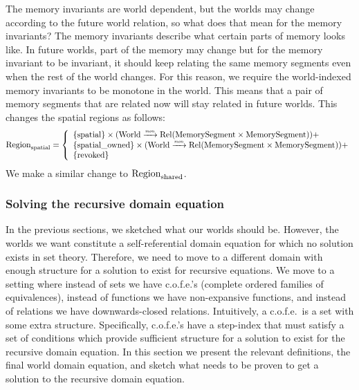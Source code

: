 \begin{jversion}
The memory invariants are world dependent, but the worlds may change according to the future world relation, so what does that mean for the memory invariants?
The memory invariants describe what certain parts of memory looks like.
In future worlds, part of the memory may change but for the memory invariant to be invariant, it should keep relating the same memory segments even when the rest of the world changes.
For this reason, we require the world-indexed memory invariants to be monotone in the world.
This means that a pair of memory segments that are related now will stay related in future worlds.
This changes the spatial regions as follows:
\[
  \mathrm{Region}_\mathrm{spatial} = \left\{
  \begin{array}{l}
    \{\mathrm{spatial} \} \times (\mathrm{World} \xrightarrow{\textit{\tiny{mon}}} \mathrm{Rel}(\mathrm{MemorySegment} \times \mathrm{MemorySegment})) + \\
    \{\mathrm{spatial\_owned} \} \times (\mathrm{World} \xrightarrow{\textit{\tiny{mon}}} \mathrm{Rel}(\mathrm{MemorySegment} \times \mathrm{MemorySegment})) + \\
    \{\mathrm{revoked} \}
  \end{array} \right.
\]
We make a similar change to $\mathrm{Region}_\mathrm{shared}$.

\subsubsection{Solving the recursive domain equation}
\label{subsubsec:rec-dom-eq}
%
In the previous sections, we sketched what our worlds should be.
However, the worlds we want constitute a self-referential domain equation for which no solution exists in set theory.
Therefore, we need to move to a different domain with enough structure for a solution to exist for recursive equations.
We move to a setting where instead of sets we have c.o.f.e.'s (complete ordered families of equivalences), instead of functions we have non-expansive functions, and instead of relations we have downwards-closed relations.
Intuitively, a c.o.f.e.\ is a set with some extra structure.
Specifically, c.o.f.e.'s have a step-index that must satisfy a set of conditions which provide sufficient structure for a solution to exist for the recursive domain equation.
In this section we present the relevant definitions, the final world domain equation, and sketch what needs to be proven to get a solution to the recursive domain equation.


\end{jversion}
